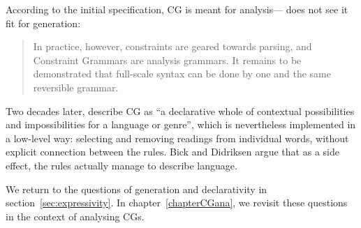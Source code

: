 {%



According to the initial specification, CG is meant for analysis---\cite{karlsson1995constraint} does not see it fit for generation:

\begin{quote}
In practice, however, constraints are geared towards parsing, and Constraint Grammars are analysis grammars. It remains to be demonstrated that full-scale syntax can be done by one and the same reversible grammar.
\end{quote}
\noindent Two decades later, \cite{bick2015} describe CG as ``a
declarative whole of contextual possibilities and impossibilities for
a language or genre'', which is nevertheless implemented in a
low-level way: selecting and removing readings from individual words,
without explicit connection between the rules. Bick and Didriksen
argue that as a side effect, the rules actually manage to describe language.

We return to the questions of generation and declarativity in section~\ref{sec:expressivity}. 
In chapter~\ref{chapterCGana}, we revisit these questions in the context of analysing CGs.

}
